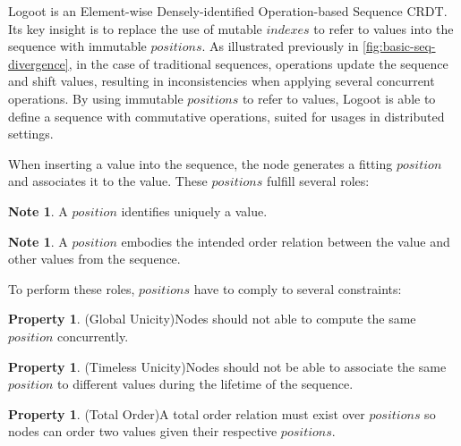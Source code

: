 \documentclass{article}
\theoremstyle{definition}
\newcounter{note-counter}
\theoremstyle{definition}
\newtheorem{note}[note-counter]{Note}
\newcounter{property-counter}
\theoremstyle{definition}
\newtheorem{property}[property-counter]{Property}
\theoremstyle{definition}
\begin{document}
Logoot is an Element-wise Densely-identified Operation-based Sequence \ac{CRDT}.
Its key insight is to replace the use of mutable $indexes$ to refer to values into the sequence with immutable $positions$.
As illustrated previously in \autoref{fig:basic-seq-divergence}, in the case of traditional sequences, operations update the sequence and shift values, resulting in inconsistencies when applying several concurrent operations.
By using immutable $positions$ to refer to values, Logoot is able to define a sequence with commutative operations, suited for usages in distributed settings.

When inserting a value into the sequence, the node generates a fitting $position$ and associates it to the value.
These $positions$ fulfill several roles:

\begin{note}
    A $position$ identifies uniquely a value.
\end{note}

\begin{note}
    A $position$ embodies the intended order relation between the value and other values from the sequence.
\end{note}


To perform these roles, $positions$ have to comply to several constraints:

\begin{property}(Global Unicity)\label{prop:global-unicity}
    Nodes should not able to compute the same $position$ concurrently.
\end{property}

\begin{property}(Timeless Unicity)\label{prop:timeless-unicity}
    Nodes should not be able to associate the same $position$ to different values during the lifetime of the sequence.
\end{property}

\begin{property}(Total Order)\label{prop:total-order}
    A total order relation must exist over $positions$ so nodes can order two values given their respective $positions$.
\end{property}
\end{document}
